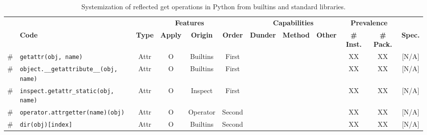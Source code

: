 \newcommand{\rownumber}{\stepcounter{rownumget}\scriptsize{\#\arabic{rownumget}}}
\newcommand{\fullcircle}{\CIRCLE}
\newcommand{\partialcircle}{\LEFTcircle}

\begin{table}[!t]
  \centering
  \scriptsize
  \caption{Systemization of reflected get operations in Python from builtins and standard libraries.}
  \begin{tabular}{ll|cccc|ccc|cc|c}
    \toprule
    \multicolumn{2}{c|}{} & 
    \multicolumn{4}{c|}{ \textbf{Features}} & 
    \multicolumn{3}{c|}{ \textbf{Capabilities}} & 
    \multicolumn{2}{c|}{ \textbf{Prevalence}} & 
    \multicolumn{1}{c}{} \\
    \cmidrule(lr){3-6} \cmidrule(lr){7-9} \cmidrule(lr){10-11}
    &  \textbf{Code} & \textbf{Type} & \textbf{Apply} & \textbf{Origin} & \textbf{Order} & 
    \textbf{Dunder} & \textbf{Method} & \textbf{Other} & 
    \textbf{\# Inst.} & \textbf{\# Pack.} &  \textbf{Spec.} \\
    \midrule
    \rownumber & \scriptsize{\texttt{getattr(obj, name)}} & \scriptsize{Attr} & \scriptsize{O} & \scriptsize{Builtins} & \scriptsize{First} & \fullcircle & \fullcircle & \fullcircle & XX & XX & [N/A] \\
    \rownumber & \scriptsize{\texttt{object.\_\_getattribute\_\_(obj, name)}} & \scriptsize{Attr} & \scriptsize{O} & \scriptsize{Builtins} & \scriptsize{First} & \fullcircle & \fullcircle & \fullcircle & XX & XX & [N/A] \\
    \rownumber & \scriptsize{\texttt{inspect.getattr\_static(obj, name)}} & \scriptsize{Attr} & \scriptsize{O} & \scriptsize{Inspect} & \scriptsize{First} & \fullcircle & \fullcircle & \fullcircle & XX & XX & [N/A] \\
    \rownumber & \scriptsize{\texttt{operator.attrgetter(name)(obj)}} & \scriptsize{Attr} & \scriptsize{O} & \scriptsize{Operator} & \scriptsize{Second} & \fullcircle & \fullcircle & \fullcircle & XX & XX & [N/A] \\
    \rownumber & \scriptsize{\texttt{dir(obj)[index]}} & \scriptsize{Attr} & \scriptsize{O} & \scriptsize{Builtins} & \scriptsize{Second} & \fullcircle & \fullcircle & \fullcircle & XX & XX & [N/A] \\

\end{tabular}
\end{table}
